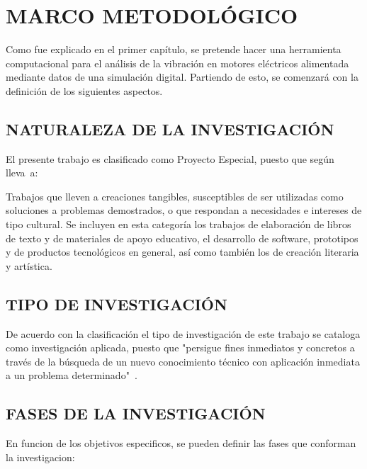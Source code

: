\thispagestyle{empty}

\section{MARCO METODOLÓGICO}

Como fue explicado en el primer capítulo, se pretende hacer una herramienta
computacional para el análisis de la vibración en motores eléctricos alimentada
mediante datos de una simulación digital. Partiendo de esto, se comenzará
con la definición de los siguientes aspectos.

\subsection{NATURALEZA DE LA INVESTIGACIÓN}

El presente trabajo es clasificado como Proyecto Especial, puesto que según
\textcite{Hernandez} lleva~a:

\begin{center}
    \parbox[ht]{13.5 cm}{Trabajos que lleven a creaciones tangibles,
    susceptibles de ser utilizadas como soluciones a problemas demostrados, o
    que respondan a necesidades e intereses de tipo cultural. Se incluyen en
    esta categoría los trabajos de elaboración de libros de texto y de
    materiales de apoyo educativo, el desarrollo de software, prototipos y de
    productos tecnológicos en general, así como también los de creación
    literaria y artística.}
\end{center}


\subsection{TIPO DE INVESTIGACIÓN}

De acuerdo con la clasificación el tipo de investigación de este trabajo se
cataloga como investigación aplicada, puesto que "persigue fines inmediatos y
concretos a través de la búsqueda de un nuevo conocimiento técnico con aplicación
inmediata a un problema determinado"\ \textcite{Velez}.





\subsection{FASES DE LA INVESTIGACIÓN}

En funcion de los objetivos especificos, se pueden definir las fases que conforman
la investigacion:

